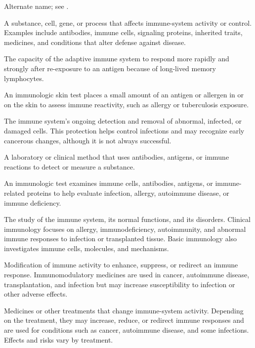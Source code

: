  Alternate name; see .

 A substance, cell, gene, or process that affects immune-system activity or control. Examples include antibodies, immune cells, signaling proteins, inherited traits, medicines, and conditions that alter defense against disease.

 The capacity of the adaptive immune system to respond more rapidly and strongly after re-exposure to an antigen because of long-lived memory lymphocytes.

 An immunologic skin test places a small amount of an antigen or allergen in or on the skin to assess immune reactivity, such as allergy or tuberculosis exposure.

 The immune system’s ongoing detection and removal of abnormal, infected, or damaged cells. This protection helps control infections and may recognize early cancerous changes, although it is not always successful.

 A laboratory or clinical method that uses antibodies, antigens, or immune reactions to detect or measure a substance.

 An immunologic test examines immune cells, antibodies, antigens, or immune-related proteins to help evaluate infection, allergy, autoimmune disease, or immune deficiency.

 The study of the immune system, its normal functions, and its disorders. Clinical immunology focuses on allergy, immunodeficiency, autoimmunity, and abnormal immune responses to infection or transplanted tissue. Basic immunology also investigates immune cells, molecules, and mechanisms.

 Modification of immune activity to enhance, suppress, or redirect an immune response. Immunomodulatory medicines are used in cancer, autoimmune disease, transplantation, and infection but may increase susceptibility to infection or other adverse effects.

 Medicines or other treatments that change immune-system activity. Depending on the treatment, they may increase, reduce, or redirect immune responses and are used for conditions such as cancer, autoimmune disease, and some infections. Effects and risks vary by treatment.

